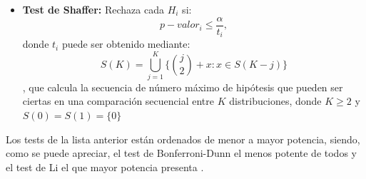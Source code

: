 \begin{itemize}
\item \textbf{Test de Shaffer:} Rechaza cada $H_i$ si:
\[ p-valor_{i} \leq \frac{\alpha}{t_i}, \]
donde $t_i$ puede ser obtenido mediante:
\[ S(K) = \bigcup_{j=1}^{K} \{{j \choose 2}  + x: x \in S(K-j)\} \]
, que calcula la secuencia de número máximo de hipótesis que pueden ser ciertas en una comparación secuencial
entre $K$ distribuciones, donde $K \geq 2$ y $S(0) = S(1) = \{0\}$
\end{itemize}

Los tests de la lista anterior están ordenados de menor a mayor potencia, siendo, como se puede apreciar,
el test de Bonferroni-Dunn el menos potente de todos y el test de Li el que mayor potencia presenta \cite{potencia}.


